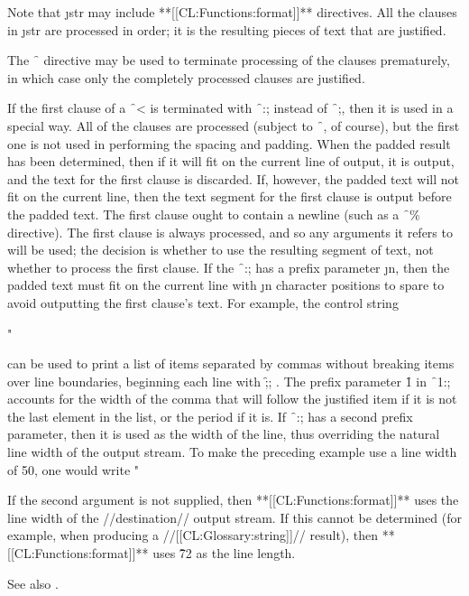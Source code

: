Note that \j{str} may include **[[CL:Functions:format]]** directives. All the clauses in \j{str} are processed in order; it is the resulting pieces of text that are justified.

The \f{~\hat } directive may be used to terminate processing of the clauses prematurely, in which case only the completely processed clauses are justified.

If the first clause of a \f{~<}  is terminated with \f{~:;} instead of \f{~;}, then it is used in a special way.  All of the clauses are processed (subject to \f{~\hat }, of course), but the  first one is not used in performing the spacing and padding.  When the padded result has been determined, then if it will fit on the current line of output, it is output, and the text for the first clause is discarded.  If, however, the padded text will not fit on the current line, then the text segment for the first clause is output before the padded text.  The first clause ought to contain a newline (such as a \f{~\%} directive).  The first clause is always processed, and so any arguments it refers to will be used; the decision is whether to use the resulting segment of text, not whether to process the first clause.  If the \f{~:;} has a prefix parameter \j{n}, then the padded text must fit on the current line with \j{n} character positions to spare to avoid outputting the first clause's text.  For example, the control string

\code
 "~%

can be used to print a list of items separated by commas without breaking items over line boundaries, beginning each line with \f{;; }.  The prefix parameter  \f{1} in \f{~1:;} accounts for the width of the comma that will follow the justified item if it is not the last element in the list, or the period  if it is.  If \f{~:;} has a second prefix parameter, then it is used as the width of the line, thus overriding the natural line width of the output stream.  To make the preceding example use a line width of 50, one would write
      \code
 "~%

If the second argument is not supplied, then **[[CL:Functions:format]]** uses the line width of the //destination// output stream. If this cannot be determined (for example, when producing a  //[[CL:Glossary:string]]// result), then **[[CL:Functions:format]]** uses \f{72} as the line length.

See also \secref\TildeLessThanLogicalBlock.

